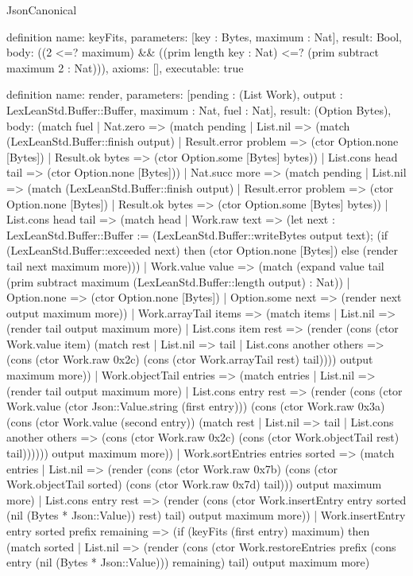 \begin{lexlean}{JsonCanonical}
\begin{semanticmodule}
definition{
  name: keyFits,
  parameters: [key : Bytes, maximum : Nat],
  result: Bool,
  body: ((2 <=? maximum) && ((prim length key : Nat) <=? (prim subtract maximum 2 : Nat))),
  axioms: [],
  executable: true
}

definition{
  name: render,
  parameters: [pending : (List Work), output : LexLeanStd.Buffer::Buffer, maximum : Nat, fuel : Nat],
  result: (Option Bytes),
  body: (match fuel
 | Nat.zero => (match pending | List.nil => (match (LexLeanStd.Buffer::finish output) | Result.error problem => (ctor Option.none [Bytes]) | Result.ok bytes => (ctor Option.some [Bytes] bytes)) | List.cons head tail => (ctor Option.none [Bytes]))
 | Nat.succ more => (match pending | List.nil => (match (LexLeanStd.Buffer::finish output) | Result.error problem => (ctor Option.none [Bytes]) | Result.ok bytes => (ctor Option.some [Bytes] bytes)) | List.cons head tail => (match head
   | Work.raw text => (let next : LexLeanStd.Buffer::Buffer := (LexLeanStd.Buffer::writeBytes output text); (if (LexLeanStd.Buffer::exceeded next) then (ctor Option.none [Bytes]) else (render tail next maximum more)))
   | Work.value value => (match (expand value tail (prim subtract maximum (LexLeanStd.Buffer::length output) : Nat)) | Option.none => (ctor Option.none [Bytes]) | Option.some next => (render next output maximum more))
   | Work.arrayTail items => (match items | List.nil => (render tail output maximum more) | List.cons item rest => (render (cons (ctor Work.value item) (match rest | List.nil => tail | List.cons another others => (cons (ctor Work.raw 0x2c) (cons (ctor Work.arrayTail rest) tail)))) output maximum more))
   | Work.objectTail entries => (match entries | List.nil => (render tail output maximum more) | List.cons entry rest => (render (cons (ctor Work.value (ctor Json::Value.string (first entry))) (cons (ctor Work.raw 0x3a) (cons (ctor Work.value (second entry)) (match rest | List.nil => tail | List.cons another others => (cons (ctor Work.raw 0x2c) (cons (ctor Work.objectTail rest) tail)))))) output maximum more))
   | Work.sortEntries entries sorted => (match entries | List.nil => (render (cons (ctor Work.raw 0x7b) (cons (ctor Work.objectTail sorted) (cons (ctor Work.raw 0x7d) tail))) output maximum more) | List.cons entry rest => (render (cons (ctor Work.insertEntry entry sorted (nil (Bytes * Json::Value)) rest) tail) output maximum more))
   | Work.insertEntry entry sorted prefix remaining => (if (keyFits (first entry) maximum) then (match sorted
     | List.nil => (render (cons (ctor Work.restoreEntries prefix (cons entry (nil (Bytes * Json::Value))) remaining) tail) output maximum more)
}
\end{semanticmodule}
\end{lexlean}
